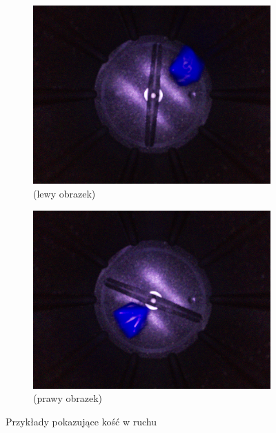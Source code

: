 \begin{figure}[H]
    \centering
    \begin{subfigure}[t]{0.45\linewidth}
        \centering
        \includegraphics[width=\linewidth]{chapters/04-czytanie/figures/wir}
        \caption{(lewy obrazek)}
        \label{fig:wir}
    \end{subfigure}
    \hfill
    \begin{subfigure}[t]{0.45\linewidth}
        \centering
        \includegraphics[width=\linewidth]{chapters/04-czytanie/figures/wir2}
        \caption{(prawy obrazek)}
        \label{fig:wir2}
    \end{subfigure}
    \caption{Przykłady pokazujące kość w ruchu}
    \label{fig:combined}
\end{figure}


